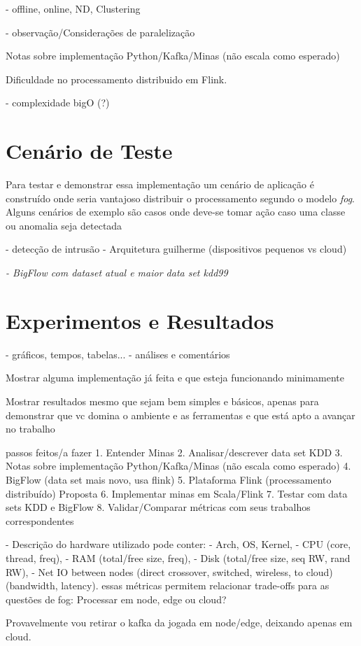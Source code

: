 - offline, online, ND, Clustering

- observação/Considerações de paralelização

Notas sobre implementação Python/Kafka/Minas (não escala como esperado)

Dificuldade no processamento distribuido em Flink.

- complexidade bigO (?)

\section{Cenário de Teste}

Para testar e demonstrar essa implementação um cenário de aplicação é construído
onde seria vantajoso distribuir o processamento segundo o modelo \emph{fog}. Alguns
cenários de exemplo são
casos onde deve-se tomar ação caso uma classe ou anomalia seja detectada



- detecção de intrusão
- Arquitetura guilherme (dispositivos pequenos vs cloud)
\cite{Cassales2019a}

\textit{- BigFlow com dataset atual e maior
data set kdd99}

\section{Experimentos e Resultados}
    - gráficos, tempos, tabelas...
    - análises e comentários


Mostrar alguma implementação já feita e que esteja funcionando minimamente

Mostrar resultados mesmo que sejam bem simples e básicos,
apenas para demonstrar que vc domina o ambiente e as ferramentas e
que está apto a avançar no trabalho 

passos feitos/a fazer
1. Entender Minas
2. Analisar/descrever data set KDD
3. Notas sobre implementação Python/Kafka/Minas (não escala como esperado)
4. BigFlow (data set mais novo, usa flink)
5. Plataforma Flink (processamento distribuído)
Proposta
6. Implementar minas em Scala/Flink
7. Testar com data sets KDD e BigFlow
8. Validar/Comparar métricas com seus trabalhos correspondentes

- Descrição do hardware utilizado pode conter:
    - Arch, OS, Kernel,
    - CPU (core, thread, freq),
    - RAM (total/free size, freq),
    - Disk (total/free size, seq RW, rand RW),
    - Net IO between nodes (direct crossover, switched, wireless, to cloud) (bandwidth, latency).
essas métricas permitem relacionar trade-offs para as questões de fog: Processar em node, edge ou cloud?

Provavelmente vou retirar o kafka da jogada em node/edge, deixando apenas em cloud.
